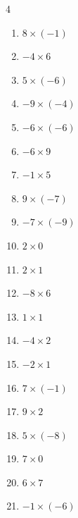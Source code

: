 \begin{multicols}{4}
\begin{enumerate}
\columnbreak %

  \item $8\times (-1)$
        \phantom{$=-8$}

  \item $-4\times 6$
        \phantom{$=-24$}

  \item $5\times (-6)$
        \phantom{$=-30$}

  \item $-9\times (-4)$
        \phantom{$=36$}

  \item $-6\times (-6)$
        \phantom{$=36$}

  \item $-6\times 9$
        \phantom{$=-54$}

  \item $-1\times 5$
        \phantom{$=-5$}

  \item $9\times (-7)$
        \phantom{$=-63$}

  \item $-7\times (-9)$
        \phantom{$=63$}

  \item $2\times 0$
        \phantom{$=0$}

  \item $2\times 1$
        \phantom{$=2$}

  \item $-8\times 6$
        \phantom{$=-48$}

  \item $1\times 1$
        \phantom{$=1$}

  \item $-4\times 2$
        \phantom{$=-8$}

  \item $-2\times 1$
        \phantom{$=-2$}

  \item $7\times (-1)$
        \phantom{$=-7$}

  \item $9\times 2$
        \phantom{$=18$}

  \item $5\times (-8)$
        \phantom{$=-40$}

  \item $7\times 0$
        \phantom{$=0$}

  \item $6\times 7$
        \phantom{$=42$}

  \item $-1\times (-6)$
        \phantom{$=6$}


\end{enumerate}
\end{multicols}
